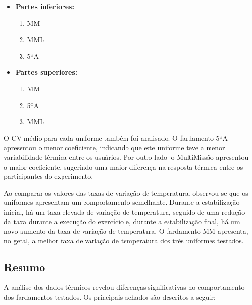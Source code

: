         \begin{itemize}
            \item \textbf{Partes inferiores:}
            \begin{enumerate}[label=\Roman*.] %
            \item \acrlong{MM}
            \item \acrlong{MML}
            \item 5ºA
            \end{enumerate}

        
            \item \textbf{Partes superiores:}
            \begin{enumerate}[label=\Roman*.] %
            \item \acrlong{MM}
            \item 5ºA
            \item \acrlong{MML}
            \end{enumerate}

        
            \end{itemize}
            
            O \acrlong{CV} médio para cada uniforme também foi analisado. O fardamento 5ºA apresentou 
            o menor coeficiente, indicando que este uniforme teve a menor variabilidade térmica entre 
            os usuários. Por outro lado, o MultiMissão apresentou o maior coeficiente, sugerindo uma 
            maior diferença na resposta térmica entre os participantes do experimento.

        Ao comparar os valores das taxas de variação de temperatura, observou-se que os 
        uniformes apresentam um comportamento semelhante. Durante a estabilização inicial, há um 
        taxa elevada de variação de temperatura, seguido de uma redução da taxa durante a execução do exercício 
        e, durante a estabilização final, há um novo aumento da taxa de variação de temperatura. 
        O fardamento \acrshort{MM} apresenta, no geral, a melhor taxa de variação de temperatura 
        dos três uniformes testados.

    \subsection{Resumo}
        A análise dos dados térmicos revelou diferenças significativas no comportamento dos 
        fardamentos testados. Os principais achados são descritos a seguir:
        
